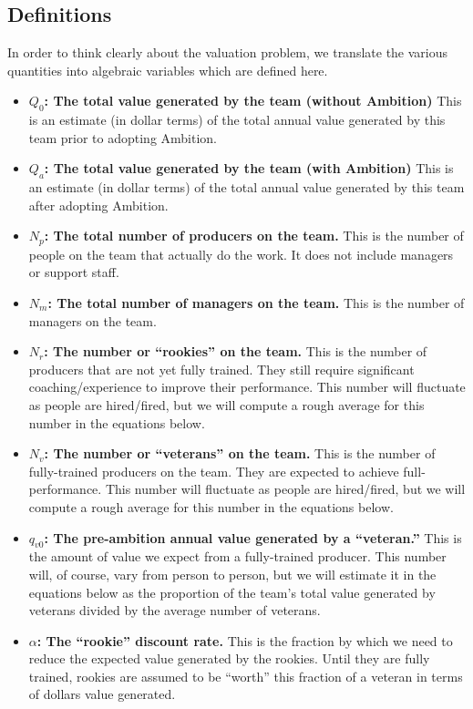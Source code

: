 \documentclass[paper=a4, fontsize=11pt abstract]{scrartcl}
\numberwithin{equation}{section}		%
\numberwithin{figure}{section}			%
\numberwithin{table}{section}				%
\begin{document}
\subsection{Definitions}
In order to think clearly about the valuation problem, we translate the various quantities into algebraic variables which are defined here.
\begin{itemize}
    \item $Q_0$\textbf{: The total value generated by the team (without Ambition)}  This is an estimate (in dollar terms) of the total annual value generated by this team prior to adopting Ambition.
    \item $Q_a$\textbf{: The total value generated by the team (with Ambition)}  This is an estimate (in dollar terms) of the total annual value generated by this team after adopting Ambition.
    \item $N_p$\textbf{: The total number of producers on the team.}  This is the number of people on the team that actually do the work.  It does not include managers or support staff.
    \item $N_m$\textbf{: The total number of managers on the team.}  This is the number of managers on the team.
    \item $N_r$\textbf{: The number or ``rookies'' on the team.}  This is the number of producers that are not yet fully trained.  They still require significant coaching/experience to improve their performance. This number will fluctuate as people are hired/fired, but we will compute a rough average for this number in the equations below.
    \item $N_v$\textbf{: The number or ``veterans'' on the team.}  This is the number of fully-trained producers on the team. They are expected to achieve full-performance. This number will fluctuate as people are hired/fired, but we will compute a rough average for this number in the equations below.
    \item $q_{v0}$\textbf{: The pre-ambition annual value generated by a ``veteran.''}  This is the amount of value we expect from a fully-trained producer.  This number will, of course, vary from person to person, but we will estimate it in the equations below as the proportion of the team's total value generated by veterans divided by the average number of veterans.
    \item $\alpha$\textbf{: The ``rookie'' discount rate.}  This is the fraction by which we need to reduce the expected value generated by the rookies.  Until they are fully trained, rookies are assumed to be ``worth'' this fraction of a veteran in terms of dollars value generated.

\end{itemize}
\end{document}
